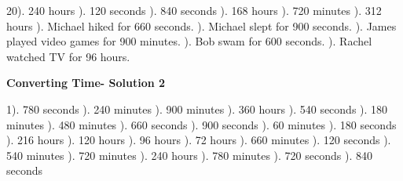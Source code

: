 \documentclass{article}%
\begin{document}
20). 240 hours%
). 120 seconds%
). 840 seconds%
). 168 hours%
). 720 minutes%
). 312 hours%
). Michael hiked for 660 seconds.%
). Michael slept for 900 seconds.%
). James played video games for 900 minutes.%
). Bob swam for 600 seconds.%
). Rachel watched TV for 96 hours.%
\newline%
\newpage%
\large%
\begin{center}%
\textbf{Converting Time- Solution 2}%
\newline%
\end{center} \normalsize%
1). 780 seconds%
). 240 minutes%
). 900 minutes%
). 360 hours%
). 540 seconds%
). 180 minutes%
). 480 minutes%
). 660 seconds%
). 900 seconds%
). 60 minutes%
). 180 seconds%
). 216 hours%
). 120 hours%
). 96 hours%
). 72 hours%
). 660 minutes%
). 120 seconds%
). 540 minutes%
). 720 minutes%
). 240 hours%
). 780 minutes%
). 720 seconds%
). 840 seconds%
\newline%
\end{document}
